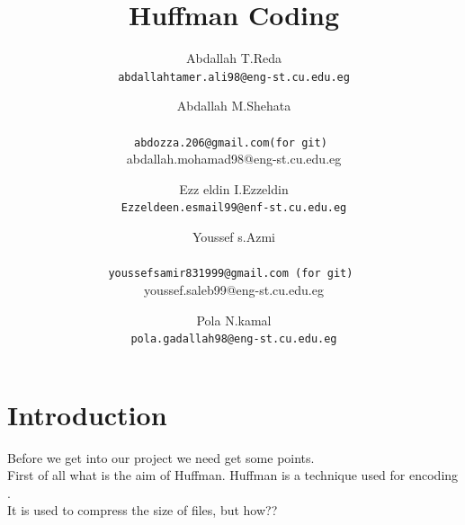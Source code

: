 \documentclass[11 pt,twocolumn,letterpaper]{article}
\begin{document}
\begin{titlepage}

\title{Huffman Coding}
\author{Abdallah T.Reda\\
{\tt\small abdallahtamer.ali98@eng-st.cu.edu.eg}
\and
Abdallah M.Shehata\\
{\tt\small abdozza.206@gmail.com(for git) 

 abdallah.mohamad98@eng-st.cu.edu.eg  }
\and
Ezz eldin I.Ezzeldin\\
{\tt\small Ezzeldeen.esmail99@enf-st.cu.edu.eg}
\and
Youssef s.Azmi\\
{\tt\small youssefsamir831999@gmail.com (for git) 

youssef.saleb99@eng-st.cu.edu.eg}
\and
Pola N.kamal\\
{\tt\small pola.gadallah98@eng-st.cu.edu.eg}
}
\maketitle 
\end{titlepage}


\setcounter{page}{2}

\section{Introduction}
    Before we get into our project we need get some points.\\
First of all what is the aim of Huffman. Huffman is a technique  used for encoding \cite{ref1}.\\
It is used to compress the size of files, but how??  \\
\end{document}
